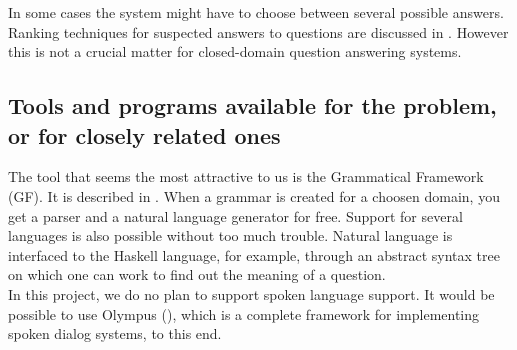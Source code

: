 \documentclass[a4paper,11pt]{article}
\begin{document}
In some cases the system might have to choose between several possible answers.
Ranking techniques for suspected answers to questions are discussed in
\cite{rankingsuspected}. However this is not a crucial matter for closed-domain
question answering systems.

\subsection{Tools and programs available for the problem, or for closely related ones}
The tool that seems the most attractive to us is the Grammatical Framework (GF). It
is described in \cite{ranta-2011}. When a grammar is created for a choosen domain,
you get a parser and a natural language generator for free. Support for several
languages is also possible without too much trouble. Natural language is interfaced to the
Haskell language, for example, through an abstract syntax tree on which one can work
to find out the meaning of a question.\\
In this project, we do no plan to support spoken language support. It would be
possible to use Olympus (\cite{olympus}), which is a complete framework for implementing spoken
dialog systems, to this end.




\end{document}
